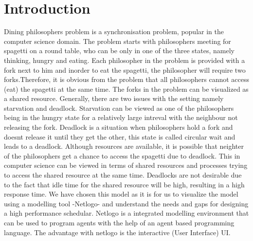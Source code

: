 \section{Introduction}

Dining philosophers problem is a synchronisation problem, popular in the computer science domain. The problem starts with philosophers meeting for spagetti on a round table, who can be only in one of the three states, namely thinking, hungry and eating. Each philosopher in the problem is provided with a fork next to him and inorder to eat the spagetti, the philosopher will require two forks.Therefore, it is obvious from the problem that all philosophers cannot access (eat) the spagetti at the same time. The forks in the problem can be visualized as a shared resource. Generally, there are two issues with the setting namely starvation and deadlock. Starvation can be viewed as one of the philosophers being in the hungry state for a relatively large intreval with the neighbour not releasing the fork. Deadlock is a situation when philosophers hold a fork and doesnt release it until they get the other, this state is called circular wait and leads to a deadlock. Although resources are available, it is possible that neighter of the philosophers get a chance to access the spagetti due to deadlock. This in computer science can be viewed in terms of shared resources and processes trying to access the shared resource at the same time. Deadlocks are not desirable due to the fact that idle time for the shared resource will be high, resulting in  a high response time. We have chosen this model as it is for us to visualize the model using a modelling tool -Netlogo- and understand the needs and gaps for designing a high performance schedular. Netlogo is a integrated modelling environment  that can be used to program agents with the help of an agent based programming language. The advantage with netlogo is the interactive (User Interface) UI.         


